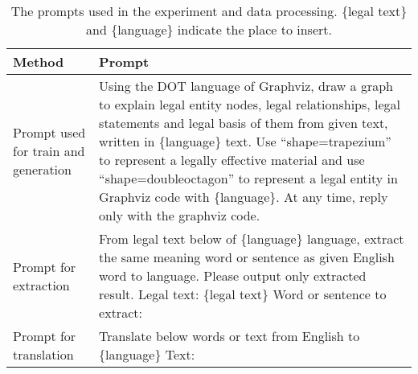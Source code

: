 \begin{table*}[h]
    \centering
    \footnotesize
        \begin{tabularx}{\linewidth}{p{30mm}X}
          \toprule
              \textbf{Method} & \textbf{Prompt} \\
          \midrule
         \cellcolor{purple} Prompt used for train and generation & Using the DOT language of Graphviz, draw a graph to explain legal entity nodes, legal relationships, legal statements and legal basis of them from given text, written in \{language\} text.
Use “shape=trapezium” to represent a legally effective material and use “shape=doubleoctagon” to represent a legal entity in Graphviz code with \{language\}.
At any time, reply only with the graphviz code.
 \\
         \midrule
         \cellcolor{purple} Prompt for extraction & From legal text below of \{language\} language, extract the same meaning word or sentence as given English word to language. Please output only extracted result. Legal text: \{legal text\} Word or sentence to extract: \\
         \midrule
         \cellcolor{purple} Prompt for translation & Translate below words or text from English to \{language\}   Text: \\
          \bottomrule
    \end{tabularx}
    \caption{
      The prompts used in the experiment and data processing. \{legal text\} and \{language\} indicate the place to insert.
    }
    \label{tab:app-prompt}
\end{table*}